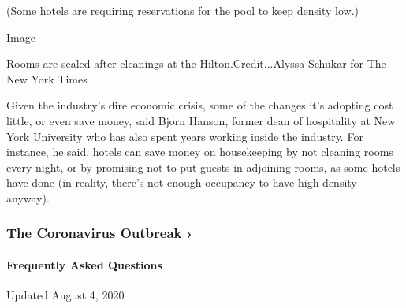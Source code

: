 (Some hotels are requiring reservations for the pool to keep density
low.)

Image

Rooms are sealed after cleanings at the Hilton.Credit...Alyssa Schukar
for The New York Times

Given the industry's dire economic crisis, some of the changes it's
adopting cost little, or even save money, said Bjorn Hanson, former dean
of hospitality at New York University who has also spent years working
inside the industry. For instance, he said, hotels can save money on
housekeeping by not cleaning rooms every night, or by promising not to
put guests in adjoining rooms, as some hotels have done (in reality,
there's not enough occupancy to have high density anyway).

\href{https://www.nytimes3xbfgragh.onion/news-event/coronavirus?action=click\&pgtype=Article\&state=default\&region=MAIN_CONTENT_3\&context=storylines_faq}{}

\hypertarget{the-coronavirus-outbreak-}{%
\subsubsection{The Coronavirus Outbreak
›}\label{the-coronavirus-outbreak-}}

\hypertarget{frequently-asked-questions}{%
\paragraph{Frequently Asked
Questions}\label{frequently-asked-questions}}

Updated August 4, 2020

